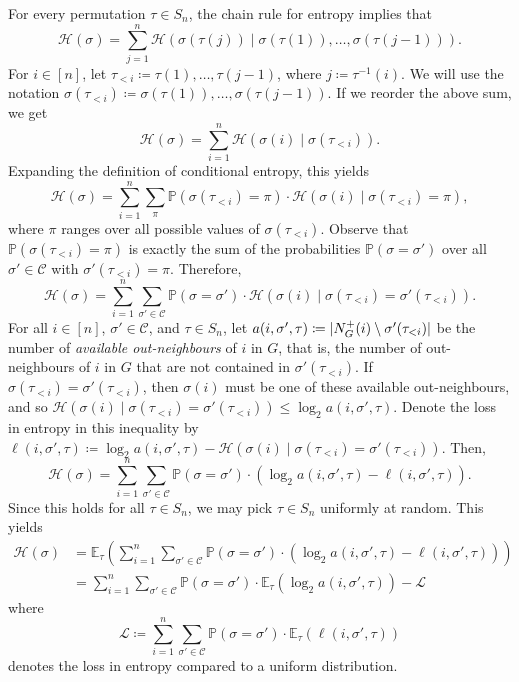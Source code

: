 \documentclass[11pt]{article}
\makeatletter
\theoremstyle{plain}
\theoremstyle{definition}
\renewenvironment{proof}[1][\proofname]
{\par\pushQED{\qed}
	\normalfont\topsep6\p@\@plus6\p@\relax\trivlist
	\item[\hskip\labelsep\bfseries#1\@addpunct{.}]
	\ignorespaces}
{\popQED\endtrivlist\@endpefalse}
\newcommand{\pr}{\mathbb{P}}
\newcommand{\ev}{\mathbb{E}}
\newcommand{\ent}{\mathcal{H}}
\newcommand{\cL}{\mathcal L}
\newcommand{\C}{\mathcal C}
\newcommand{\logt}{\log_2}
\DeclarePairedDelimiter{\abs}{\lvert}{\rvert}
\makeatother
\begin{document}
\begin{proof}
    For every permutation $\tau \in S_n$, the chain rule for entropy implies that
    \[
        \ent(\sigma) = \sum_{j=1}^n \ent(\sigma(\tau(j)) \mid \sigma(\tau(1)), \dots, \sigma(\tau(j-1))).
    \]
    For $i \in [n]$, let $\tau_{<i} \coloneqq \tau(1), \dots, \tau(j-1)$, where $j \coloneqq \tau^{-1}(i)$. We will use the notation $\sigma(\tau_{<i}) \coloneqq \sigma(\tau(1)), \dots, \sigma(\tau(j-1))$. If we reorder the above sum, we get
    \[
        \ent(\sigma) = \sum_{i=1}^n \ent(\sigma(i) \mid \sigma(\tau_{<i})).
    \]
    Expanding the definition of conditional entropy, this yields
    \[
        \ent(\sigma) = \sum_{i=1}^n \sum_\pi \pr(\sigma(\tau_{<i}) = \pi) \cdot \ent(\sigma(i) \mid \sigma(\tau_{<i}) = \pi),
    \]
    where $\pi$ ranges over all possible values of $\sigma(\tau_{<i})$. Observe that $\pr(\sigma(\tau_{<i}) = \pi)$ is exactly the sum of the probabilities $\pr(\sigma = \sigma')$ over all $\sigma' \in \C$ with $\sigma'(\tau_{<i}) = \pi$. Therefore,
    \[
        \ent(\sigma) = \sum_{i=1}^n \sum_{\sigma' \in \C} \pr(\sigma = \sigma') \cdot \ent(\sigma(i) \mid \sigma(\tau_{<i}) = \sigma'(\tau_{<i})).
    \]
    For all $i \in [n]$, $\sigma' \in \C$, and $\tau \in S_n$, let $a(i,\sigma',\tau) \coloneqq \abs{N_G^+(i) \setminus \sigma'(\tau_{<i})}$ be the number of \emph{available out-neighbours} of $i$ in $G$, that is, the number of out-neighbours of $i$ in $G$ that are not contained in $\sigma'(\tau_{<i})$. If $\sigma(\tau_{<i}) = \sigma'(\tau_{<i})$, then $\sigma(i)$ must be one of these available out-neighbours, and so $\ent(\sigma(i) \mid \sigma(\tau_{<i}) = \sigma'(\tau_{<i})) \le \logt a(i,\sigma',\tau)$. Denote the loss in entropy in this inequality by $\ell(i,\sigma',\tau) \coloneqq \logt a(i,\sigma',\tau) - \ent(\sigma(i) \mid \sigma(\tau_{<i}) = \sigma'(\tau_{<i}))$. Then,
    \[
        \ent(\sigma) = \sum_{i=1}^n \sum_{\sigma' \in \C} \pr(\sigma = \sigma') \cdot (\logt a(i,\sigma',\tau) - \ell(i,\sigma',\tau)).
    \]
    Since this holds for all $\tau \in S_n$, we may pick $\tau \in S_n$ uniformly at random. This yields
    \begin{align*}
        \ent(\sigma) & = \ev_\tau\left(\sum_{i=1}^n \sum_{\sigma' \in \C} \pr(\sigma = \sigma') \cdot (\logt a(i,\sigma',\tau) - \ell(i,\sigma',\tau))\right) \\
        & = \sum_{i=1}^n \sum_{\sigma' \in \C} \pr(\sigma = \sigma') \cdot \ev_\tau(\logt a(i,\sigma',\tau)) - \cL
    \end{align*}
    where
    \[
        \cL \coloneqq \sum_{i=1}^n \sum_{\sigma' \in \C} \pr(\sigma = \sigma') \cdot \ev_\tau(\ell(i,\sigma',\tau))
    \]
    denotes the loss in entropy compared to a uniform distribution.
    

\end{proof}
\end{document}
